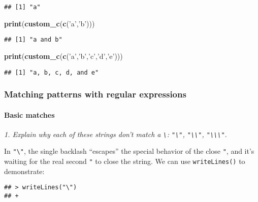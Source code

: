 \documentclass[]{article}
\newenvironment{Shaded}{\begin{snugshade}}{\end{snugshade}}
\newcommand{\KeywordTok}[1]{\textcolor[rgb]{0.13,0.29,0.53}{\textbf{#1}}}
\newcommand{\StringTok}[1]{\textcolor[rgb]{0.31,0.60,0.02}{#1}}
\newcommand{\NormalTok}[1]{#1}
\let\oldparagraph\paragraph
\renewcommand{\paragraph}[1]{\oldparagraph{#1}\mbox{}}
\theoremstyle{definition}
\theoremstyle{definition}
\theoremstyle{definition}
\theoremstyle{remark}
\begin{document}
\begin{verbatim}
## [1] "a"
\end{verbatim}

\begin{Shaded}
\begin{Highlighting}[]
\KeywordTok{print}\NormalTok{(}\KeywordTok{custom_c}\NormalTok{(}\KeywordTok{c}\NormalTok{(}\StringTok{'a'}\NormalTok{,}\StringTok{'b'}\NormalTok{)))}
\end{Highlighting}
\end{Shaded}

\begin{verbatim}
## [1] "a and b"
\end{verbatim}

\begin{Shaded}
\begin{Highlighting}[]
\KeywordTok{print}\NormalTok{(}\KeywordTok{custom_c}\NormalTok{(}\KeywordTok{c}\NormalTok{(}\StringTok{'a'}\NormalTok{,}\StringTok{'b'}\NormalTok{,}\StringTok{'c'}\NormalTok{,}\StringTok{'d'}\NormalTok{,}\StringTok{'e'}\NormalTok{)))}
\end{Highlighting}
\end{Shaded}

\begin{verbatim}
## [1] "a, b, c, d, and e"
\end{verbatim}

\subsubsection{Matching patterns with regular
expressions}\label{matching-patterns-with-regular-expressions}

\paragraph{Basic matches}\label{basic-matches}

\emph{1. Explain why each of these strings don't match a
\texttt{\textbackslash{}}: \texttt{"\textbackslash{}"},
\texttt{"\textbackslash{}\textbackslash{}"},
\texttt{"\textbackslash{}\textbackslash{}\textbackslash{}"}.}

In \texttt{"\textbackslash{}"}, the single backlash ``escapes'' the
special behavior of the close \texttt{"}, and it's waiting for the real
second \texttt{"} to close the string. We can use \texttt{writeLines()}
to demonstrate:

\begin{verbatim}
## > writeLines("\")
## +
\end{verbatim}
\end{document}
